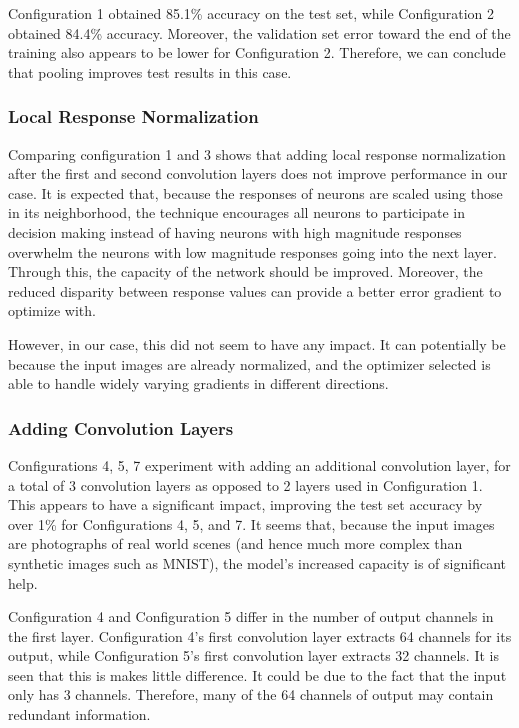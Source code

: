 \documentclass{article} %
\begin{document}
Configuration 1 obtained 85.1\% accuracy on the test set, while Configuration 2 obtained 84.4\% accuracy. Moreover, the validation set error toward the end of the training also appears to be lower for Configuration 2. Therefore, we can conclude that pooling improves test results in this case. 

\subsubsection{Local Response Normalization}

Comparing configuration 1 and 3 shows that adding local response normalization after the first and second convolution layers does not improve performance in our case. It is expected that, because the responses of neurons are scaled using those in its neighborhood, the technique encourages all neurons to participate in decision making instead of having neurons with high magnitude responses overwhelm the neurons with low magnitude responses going into the next layer. Through this, the capacity of the network should be improved. Moreover, the reduced disparity between response values can provide a better error gradient to optimize with.

However, in our case, this did not seem to have any impact. It can potentially be because the input images are already normalized, and the optimizer selected is able to handle widely varying gradients in different directions. 

\subsubsection{Adding Convolution Layers}

Configurations 4, 5, 7 experiment with adding an additional convolution layer, for a total of 3 convolution layers as opposed to 2 layers used in Configuration 1. This appears to have a significant impact, improving the test set accuracy by over 1\% for Configurations 4, 5, and 7. It seems that, because the input images are photographs of real world scenes (and hence much more complex than synthetic images such as MNIST), the model's increased capacity is of significant help. 

Configuration 4 and Configuration 5 differ in the number of output channels in the first layer. Configuration 4's first convolution layer extracts 64 channels for its output, while Configuration 5's first convolution layer extracts 32 channels. It is seen that this is makes little difference. It could be due to the fact that the input only has 3 channels. Therefore, many of the 64 channels of output may contain redundant information.
\end{document}
